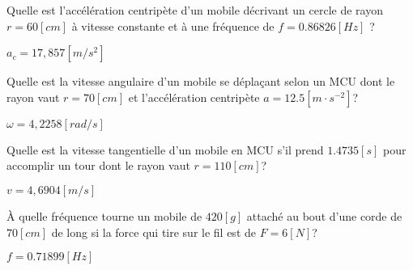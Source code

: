 \begin{exercise}
    Quelle est l'accélération centripète d'un mobile décrivant un cercle de rayon \(r=60[cm]\) à vitesse constante et à une fréquence de \(f=0.86826[Hz]\) ?
\end{exercise}
\begin{solution}
    \(a_c=17,857[m/s^2]\)
\end{solution}
\begin{exercise}
    Quelle est la vitesse angulaire d'un mobile se déplaçant selon un MCU dont le rayon vaut \(r=70[cm]\) et l'accélération centripète \(a=12.5[m \cdot s^{-2}]\)?
\end{exercise}
\begin{solution}
    \(\omega=4,2258 [rad/s]\)
\end{solution}
\begin{exercise}
    Quelle est la vitesse tangentielle d'un mobile en MCU s'il prend \(1.4735[s]\) pour accomplir un tour dont le rayon vaut \(r=110[cm]\)?
\end{exercise}
\begin{solution}
    \(v=4,6904 [m/s]\)
\end{solution}
\begin{exercise}
    À quelle fréquence tourne un mobile de \(420[g]\) attaché au bout d'une corde de \(70[cm]\) de long si la force qui tire sur le fil est de \(F=6[N]\)?
\end{exercise}
\begin{solution}
    \(f=0.71899[Hz]\)
\end{solution}

